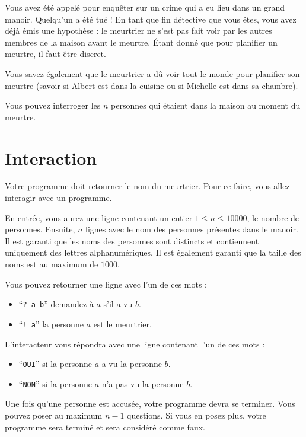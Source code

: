 \problemname{\problemyamlname}


\newcommand{\maxn}{10^4}  %

Vous avez été appelé pour enquêter sur un crime qui a eu lieu dans un grand manoir. Quelqu'un a été tué ! En tant que fin détective que vous êtes, vous avez déjà émis une hypothèse : le meurtrier ne s'est pas fait voir par les autres membres de la maison avant le meurtre. Étant donné que pour planifier un meurtre, il faut être discret.

Vous savez également que le meurtrier a dû voir tout le monde pour planifier son meurtre (savoir si Albert est dans la cuisine ou si Michelle est dans sa chambre).

Vous pouvez interroger les $n$ personnes qui étaient dans la maison au moment du meurtre.

\section*{Interaction}
Votre programme doit retourner le nom du meurtrier. Pour ce faire, vous allez interagir avec un programme.

En entrée, vous aurez une ligne contenant un entier $1 \le n \le 10000$, le nombre de personnes.
Ensuite, $n$ lignes avec le nom des personnes présentes dans le manoir. Il est garanti que les noms des personnes sont distincts et contiennent uniquement des lettres alphanumériques. Il est également garanti que la taille des noms est au maximum de $1000$.

Vous pouvez retourner une ligne avec l'un de ces mots :

\begin{itemize}
    \item ``\texttt{? a b}'' demandez à $a$ s'il a vu $b$.
    \item ``\texttt{! a}'' la personne $a$ est le meurtrier.
\end{itemize}

L'interacteur vous répondra avec une ligne contenant l'un de ces mots :

\begin{itemize}
    \item ``\texttt{OUI}'' si la personne $a$ a vu la personne $b$.
    \item ``\texttt{NON}'' si la personne $a$ n'a pas vu la personne $b$.
\end{itemize}

Une fois qu'une personne est accusée, votre programme devra se terminer.
Vous pouvez poser au maximum $n - 1$ questions. Si vous en posez plus, votre programme sera terminé et sera considéré comme faux.
